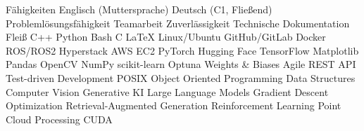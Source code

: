 
\begin{rubric}{Fähigkeiten}
\entry*[Sprachen]
	\skilldotfirst Englisch (Muttersprache) \skilldot Deutsch (C1, Fließend)
\entry*[Stärken] 
	\skilldotfirst Problemlösungsfähigkeit \skilldot Teamarbeit \skilldot Zuverlässigkeit \newline \skilldotfirst Technische Dokumentation \skilldot Fleiß %
\entry*[Coding]
	\skilldotfirst C++ \skilldot Python \skilldot Bash \skilldot C \skilldot LaTeX
\entry*[Software] 
	\skilldotfirst Linux/Ubuntu \skilldot GitHub/GitLab \skilldot Docker \skilldot ROS/ROS2 \newline \skilldotfirst Hyperstack \skilldot AWS EC2
\entry*[Libraries (Py)] 
	\skilldotfirst PyTorch \skilldot Hugging Face \skilldot TensorFlow \skilldot Matplotlib \skilldot Pandas \newline \skilldot OpenCV \skilldot NumPy \skilldot scikit-learn \skilldot Optuna \skilldot Weights \& Biases
\entry*[Wissen] 	
	\skilldotfirst Agile \skilldot REST API \skilldot Test-driven Development \skilldot POSIX  \newline \skilldotfirst Object Oriented Programming \skilldot Data Structures 
	\skilldotfirst Computer Vision \skilldot Generative KI \skilldot Large Language Models \newline \skilldotfirst Gradient Descent Optimization \skilldot Retrieval-Augmented Generation \newline \skilldotfirst Reinforcement Learning  \skilldot Point Cloud Processing \skilldot CUDA 

\end{rubric}
